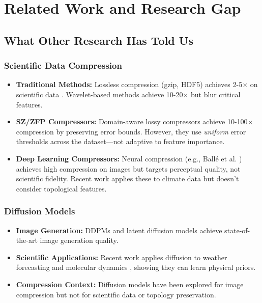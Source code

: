 \documentclass[11pt]{article}
\begin{document}
\section{Related Work and Research Gap}

\subsection{What Other Research Has Told Us}

\subsubsection{Scientific Data Compression}

\begin{itemize}
    \item \textbf{Traditional Methods:} Lossless compression (gzip, HDF5) achieves 2-5$\times$ on scientific data \cite{lakshminarasimhan2011compressing}. Wavelet-based methods achieve 10-20$\times$ but blur critical features.

    \item \textbf{SZ/ZFP Compressors:} Domain-aware lossy compressors \cite{di2016fast, lindstrom2014fixed} achieve 10-100$\times$ compression by preserving error bounds. However, they use \textit{uniform} error thresholds across the dataset—not adaptive to feature importance.

    \item \textbf{Deep Learning Compressors:} Neural compression (e.g., Ballé et al. \cite{balle2018variational}) achieves high compression on images but targets perceptual quality, not scientific fidelity. Recent work applies these to climate data \cite{glaws2020deep} but doesn't consider topological features.
\end{itemize}

\subsubsection{Diffusion Models}

\begin{itemize}
    \item \textbf{Image Generation:} DDPMs \cite{ho2020denoising} and latent diffusion models \cite{rombach2022high} achieve state-of-the-art image generation quality.

    \item \textbf{Scientific Applications:} Recent work applies diffusion to weather forecasting \cite{price2024gencast} and molecular dynamics \cite{hoogeboom2022equivariant}, showing they can learn physical priors.

    \item \textbf{Compression Context:} Diffusion models have been explored for image compression \cite{theis2022lossy} but not for scientific data or topology preservation.
\end{itemize}
\end{document}
